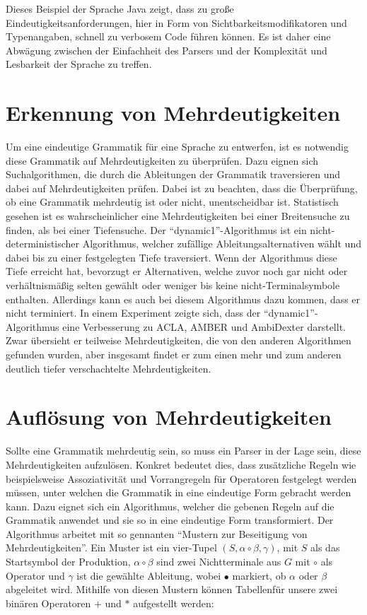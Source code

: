 \documentclass[runningheads]{llncs}
\begin{document}
	Dieses Beispiel der Sprache Java zeigt, dass zu große Eindeutigkeitsanforderungen,
	hier in Form von Sichtbarkeitsmodifikatoren und Typenangaben, schnell zu verbosem Code führen können.
	Es ist daher eine Abwägung zwischen der Einfachheit des Parsers und der Komplexität und Lesbarkeit der Sprache zu treffen.


	\section{Erkennung von Mehrdeutigkeiten}\label{sec:erkennung-von-mehrdeutigkeiten}

	Um eine eindeutige Grammatik für eine Sprache zu entwerfen,
	ist es notwendig diese Grammatik auf Mehrdeutigkeiten zu überprüfen.
	Dazu eignen sich Suchalgorithmen, die durch die Ableitungen der Grammatik traversieren
	und dabei auf Mehrdeutigkeiten prüfen.
	Dabei ist zu beachten, dass die Überprüfung, ob eine Grammatik mehrdeutig ist oder nicht,
	unentscheidbar ist.\cite{hopcroft2006introduction}
	Statistisch gesehen ist es wahrscheinlicher eine Mehrdeutigkeiten bei einer Breitensuche zu finden,
	als bei einer Tiefensuche.\cite{springer2013}
	Der ``dynamic1''-Algorithmus\cite{springer2013} ist ein nicht-deterministischer Algorithmus,
	welcher zufällige Ableitungsalternativen wählt und dabei bis zu einer festgelegten Tiefe traversiert.
	Wenn der Algorithmus diese Tiefe erreicht hat, bevorzugt er Alternativen, welche zuvor noch gar nicht oder
	verhältnismäßig selten gewählt oder weniger bis keine nicht-Terminalsymbole enthalten.
	Allerdings kann es auch bei diesem Algorithmus dazu kommen, dass er nicht terminiert.
	In einem Experiment\cite{springer2013} zeigte sich,
	dass der ``dynamic1''-Algorithmus eine Verbesserung zu ACLA, AMBER und AmbiDexter darstellt.
	Zwar übersieht er teilweise Mehrdeutigkeiten, die von den anderen Algorithmen gefunden wurden,
	aber insgesamt findet er zum einen mehr und zum anderen deutlich tiefer verschachtelte Mehrdeutigkeiten.


	\section{Auflösung von Mehrdeutigkeiten}\label{sec:auflosung-von-mehrdeutigkeiten}

	Sollte eine Grammatik mehrdeutig sein, so muss ein Parser in der Lage sein, diese Mehrdeutigkeiten aufzulösen.
	Konkret bedeutet dies, dass zusätzliche Regeln
	wie beispielsweise Assoziativität und Vorrangregeln für Operatoren festgelegt werden müssen,
	unter welchen die Grammatik in eine eindeutige Form gebracht werden kann.
	Dazu eignet sich ein Algorithmus\footnotemark[1], welcher die gebenen Regeln auf die Grammatik anwendet
	und sie so in eine eindeutige Form transformiert.
	Der Algorithmus arbeitet mit so gennanten ``Mustern zur Beseitigung von Mehrdeutigkeiten''.
	Ein Muster ist ein vier-Tupel $(S, \alpha \circ \beta, \gamma)$, mit $S$ als das Startsymbol der Produktion,
	$\alpha \circ \beta$ sind zwei Nichtterminale aus $G$ mit $\circ$ als Operator und $\gamma$ ist die gewählte Ableitung, wobei
	$\bullet$ markiert, ob $\alpha$ oder $\beta$ abgeleitet wird.
	Mithilfe von diesen Mustern können Tabellen\footnotemark[2] für unsere zwei binären Operatoren $+$ und $*$ aufgestellt werden:
\end{document}
